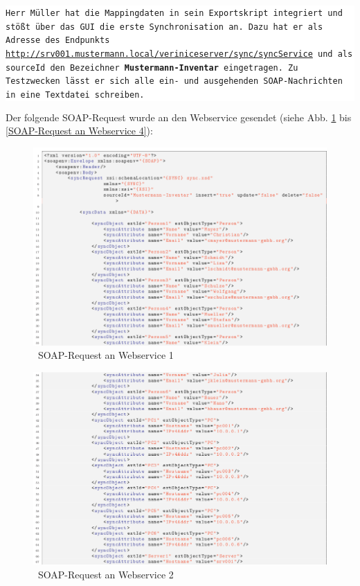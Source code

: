 \documentclass[a4paper,10pt]{book}
\begin{document}
\colorbox{white}{\parbox{\textwidth}{
{\tt Herr Müller hat die Mappingdaten in sein Exportskript integriert und stößt über das GUI die erste Synchronisation an. Dazu hat er als Adresse des Endpunkts
\newline
\href{http://srv001.mustermann.local/veriniceserver/sync/syncService}{http://srv001.mustermann.local/veriniceserver/sync/syncService}
\newline
und als sourceId den Bezeichner \textbf{Mustermann-Inventar} eingetragen. Zu Testzwecken lässt er sich alle ein- und ausgehenden SOAP-Nachrichten in eine
Textdatei schreiben.}
}}
\newline\newline
Der folgende SOAP-Request wurde an den Webservice gesendet (siehe Abb. \ref{SOAP-Request an Webservice 1} bis \ref{SOAP-Request an Webservice 4}):
\newline
\begin{figure}[htb!]
  \centering
  \includegraphics[scale=.55]{Screenshot/SyncAPI_Fallstudie_04.png}
  \caption{\label{SOAP-Request an Webservice 1} \ SOAP-Request an Webservice 1}
\end{figure}
\newline
\begin{figure}[htb!]
  \centering
  \includegraphics[scale=.55]{Screenshot/SyncAPI_Fallstudie_05.png}
  \caption{\label{SOAP-Request an Webservice 2} \ SOAP-Request an Webservice 2}
\end{figure}
\end{document}
